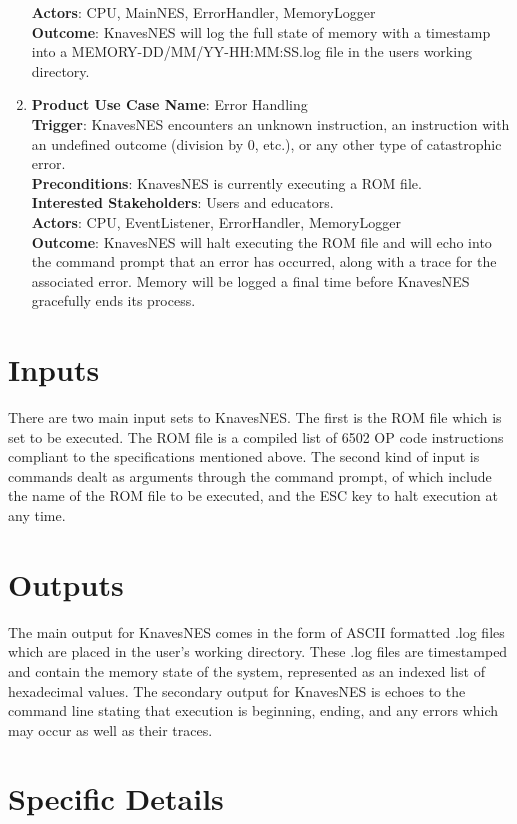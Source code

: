 \documentclass[12pt]{article}
\begin{document}
\begin{enumerate}
			\textbf{Actors}: CPU, MainNES, ErrorHandler, MemoryLogger\\
			\textbf{Outcome}: KnavesNES will log the full state of memory with a timestamp into a MEMORY-DD/MM/YY-HH:MM:SS.log file in the users working directory.\\
		\item \large{\textbf{Product Use Case Name}: Error Handling}\normalsize\\
			\textbf{Trigger}: KnavesNES encounters an unknown instruction, an instruction with an undefined outcome (division by 0, etc.), or any other type of catastrophic error.\\
			\textbf{Preconditions}: KnavesNES is currently executing a ROM file.\\
			\textbf{Interested Stakeholders}: Users and educators.\\
			\textbf{Actors}: CPU, EventListener, ErrorHandler, MemoryLogger\\
			\textbf{Outcome}: KnavesNES will halt executing the ROM file and will echo into the command prompt that an error has occurred, along with a trace for the associated error. Memory will be logged a final time before KnavesNES gracefully ends its process.\\
	\end{enumerate}
\section{Inputs}
	There are two main input sets to KnavesNES. The first is the ROM file which is set to be executed. The ROM file is a compiled list of 6502 OP code instructions compliant to the specifications mentioned above. The second kind of input is commands dealt as arguments through the command prompt, of which include the name of the ROM file to be executed, and the ESC key to halt execution at any time.
\section{Outputs}
	The main output for KnavesNES comes in the form of ASCII formatted .log files which are placed in the user’s working directory. These .log files are timestamped and contain the memory state of the system, represented as an indexed list of hexadecimal values. The secondary output for KnavesNES is echoes to the command line stating that execution is beginning, ending, and any errors which may occur as well as their traces.
\section{Specific Details}
\end{document}

